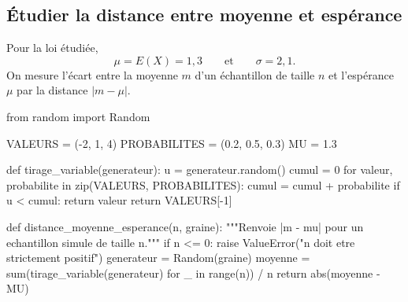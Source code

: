 \subsection{Étudier la distance entre moyenne et espérance}

Pour la loi étudiée,
\[
  \mu=E(X)=1{,}3\qquad\text{et}\qquad \sigma=2{,}1.
\]
On mesure l'écart entre la moyenne $m$ d'un échantillon de taille $n$ et
l'espérance $\mu$ par la distance $\lvert m-\mu\rvert$.

\begin{python}
from random import Random

VALEURS = (-2, 1, 4)
PROBABILITES = (0.2, 0.5, 0.3)
MU = 1.3

def tirage_variable(generateur):
    u = generateur.random()
    cumul = 0
    for valeur, probabilite in zip(VALEURS, PROBABILITES):
        cumul = cumul + probabilite
        if u < cumul:
            return valeur
    return VALEURS[-1]

def distance_moyenne_esperance(n, graine):
    """Renvoie |m - mu| pour un echantillon simule de taille n."""
    if n <= 0:
        raise ValueError("n doit etre strictement positif")
    generateur = Random(graine)
    moyenne = sum(tirage_variable(generateur) for _ in range(n)) / n
    return abs(moyenne - MU)
\end{python}


